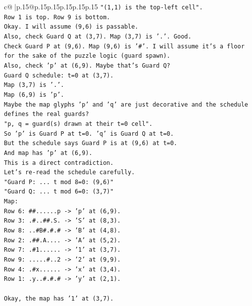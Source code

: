 \documentclass{article}
\begin{document}
{\begin{supertabular}{c@{$\;$}|p{.15\linewidth}@{}p{.15\linewidth}p{.15\linewidth}p{.15\linewidth}p{.15\linewidth}p{.15\linewidth}}
{{{\texttt{"(1,1) is the top{-}left cell".} \\
\texttt{Row 1 is top. Row 9 is bottom.} \\
\texttt{Okay. I will assume (9,6) is passable.} \\
\texttt{Also, check Guard Q at (3,7). Map (3,7) is '.'. Good.} \\
\texttt{Check Guard P at (9,6). Map (9,6) is '\#'. I will assume it's a floor for the sake of the puzzle logic (guard spawn).} \\
\texttt{Also, check 'p' at (6,9). Maybe that's Guard Q?} \\
\texttt{Guard Q schedule: t=0 at (3,7).} \\
\texttt{Map (3,7) is '.'.} \\
\texttt{Map (6,9) is 'p'.} \\
\texttt{Maybe the map glyphs 'p' and 'q' are just decorative and the schedule defines the real guards?} \\
\texttt{"p, q = guard(s) drawn at their t=0 cell".} \\
\texttt{So 'p' is Guard P at t=0. 'q' is Guard Q at t=0.} \\
\texttt{But the schedule says Guard P is at (9,6) at t=0.} \\
\texttt{And map has 'p' at (6,9).} \\
\texttt{This is a direct contradiction.} \\
\texttt{Let's re{-}read the schedule carefully.} \\
\texttt{"Guard P: ... t mod 8=0: (9,6)"} \\
\texttt{"Guard Q: ... t mod 6=0: (3,7)"} \\
\texttt{Map:} \\
\texttt{Row 6: \#\#......p {-}> 'p' at (6,9).} \\
\texttt{Row 3: .\#..\#\#.S. {-}> 'S' at (8,3).} \\
\texttt{Row 8: ..\#B\#.\#.\# {-}> 'B' at (4,8).} \\
\texttt{Row 2: .\#\#.A.... {-}> 'A' at (5,2).} \\
\texttt{Row 7: .\#1...... {-}> '1' at (3,7).} \\
\texttt{Row 9: .....\#..2 {-}> '2' at (9,9).} \\
\texttt{Row 4: .\#x...... {-}> 'x' at (3,4).} \\
\texttt{Row 1: .y..\#.\#.\# {-}> 'y' at (2,1).} \\
\\ 
\texttt{Okay, the map has '1' at (3,7).} \\
}}}
\end{supertabular}}
\end{document}
